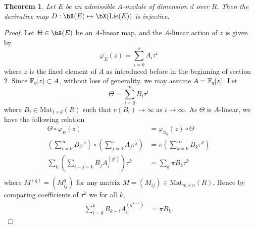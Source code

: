 \documentclass{amsart}
\newtheorem {theorem} {\bf{Theorem}}[section]
\numberwithin {equation}{section}
\def \hG{\hat{\mathbb{G}}_{\mathrm{a}}}
\DeclareMathOperator{\Lie}{\mathrm{Lie}}
\begin{document}
\begin{theorem}\label{inj-lie} Let $E$ be an admissible $A$-module of dimension $d$ over $R$. Then the derivative map $D:\bX(E)\mapsto \bX(\Lie(E))$ is injective.
\end{theorem}
\begin{proof}
Let $\Theta\in \bX(E)$  be an $A$-linear map, and the $A$-linear action of $z$ is given by  $$\varphi_{E}(z)=\displaystyle{\sum_{i=0}^{s}}A_{i}{\tau}^{i}$$
where $z$ is the fixed element of $A$ as introduced before in the beginning of  section $2$.
Since $\mathbb{F}_{q}[z]\subset A$, without loss of generality, we may assume $A=\mathbb{F}_{q}[z]$. Let $$\Theta=\displaystyle{\sum_{i=0}^{\infty}}B_{i}{\tau}^{i}$$ where $B_{i}\in \mathrm{Mat}_{1\times d}(R)$ such that $v(B_{i})\rightarrow \infty$ as $i\rightarrow \infty$. As $\Theta$ is $A$-linear, we have the following relation
\begin{align*}
\nonumber \Theta \circ \varphi_{E}(z)&=\varphi_{\hG}(z)\circ \Theta\\
\nonumber\left(\displaystyle{\sum_{i=0}^{\infty}}B_{i}{\tau}^{i}\right)\circ \left(\displaystyle{\sum_{j=0}^{s}}A_{j}{\tau}^{j}\right)&=\pi \left(\displaystyle{\sum_{k=0}^{\infty}}B_{k}{\tau}^{k}\right)\\
\nonumber\displaystyle{\sum_{k}}\left(\displaystyle{\sum_{i+j=k}}B_{j} A_{i}^{(q^{j})}\right){\tau}^{k}&=\displaystyle{\sum_{k}}\pi B_{k}{\tau}^{k}\\
\end{align*}
where $M^{(q)}=\left(M^{q}_{ij}\right)$ for any matrix $M=(M_{ij})\in\mathrm{Mat}_{m\times n}(R)$.
Hence by comparing coefficients of $\tau^k$ we for all $k$,
\begin{align}\label{co-ca}
\displaystyle{\sum_{i=0}^{k}} B_{k-i} A_{i}^{(q^{k-i})}&= \pi B_{k}.
\end{align}



\end{proof}
\end{document}
